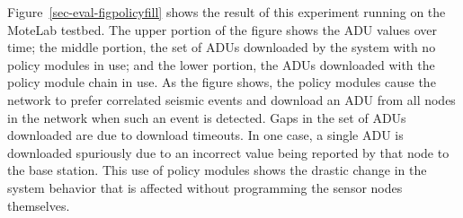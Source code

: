 Figure~\ref{sec-eval-figpolicyfill} shows the result of this
experiment running on the MoteLab testbed. The upper portion of the
figure shows the ADU values over time; the middle portion, the set of ADUs
downloaded by the system with no policy modules in use; and the lower
portion, the ADUs downloaded with the policy module chain in use.
As the figure shows, the policy modules cause the network to prefer 
correlated seismic events and download an ADU from all nodes in
the network when such an event is detected. Gaps in the set of ADUs
downloaded are due to download timeouts. In one case, a single ADU 
is downloaded spuriously due to an incorrect value being reported by
that node to the base station. This use of policy modules shows the
drastic change in the system behavior that is affected without
programming the sensor nodes themselves.




